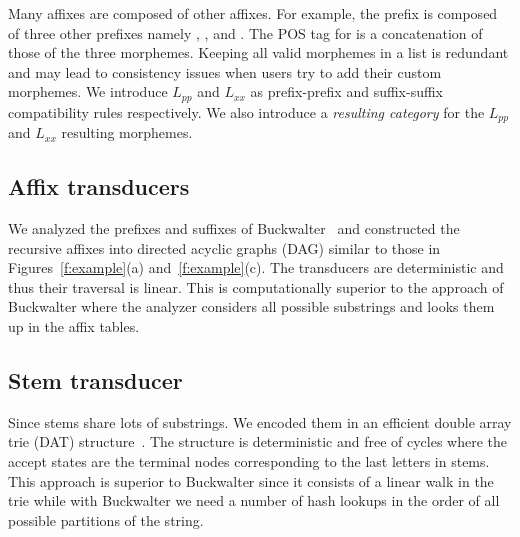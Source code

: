 \documentclass[11pt]{article}
\newcommand{\noTrRL}[1]{\transfalse\RL{#1}\transtrue}
\newcommand{\noTrnoVocRL}[1]{\transfalse\novocalize\noTrRL{#1}\vocalize\transtrue}
\begin{document}
Many affixes are composed of other affixes. For example,
the prefix \noTrnoVocRL{wsy} is composed of three other prefixes
namely \noTrnoVocRL{w}, \noTrnoVocRL{s}, and \noTrnoVocRL{y}.
The POS tag for \noTrnoVocRL{wsy} is a concatenation
of those of the three morphemes. 
Keeping all valid morphemes in a list
is redundant and may lead to consistency issues when
users try to add their custom morphemes.
We introduce $L_{pp}$ and
$L_{xx}$ as prefix-prefix and suffix-suffix 
compatibility rules respectively.
We also introduce a {\em resulting category}
for the $L_{pp}$ and  $L_{xx}$ resulting morphemes.


\subsection{Affix transducers}
\label{sec:affixFSA}

We analyzed the prefixes and suffixes of 
Buckwalter~
and constructed the recursive affixes
into directed acyclic graphs (DAG) similar to 
those in Figures~\ref{f:example}(a) and~\ref{f:example}(c).
The transducers are deterministic and thus 
their traversal is linear.
This is computationally superior to the 
approach of Buckwalter where the analyzer considers
all possible substrings %
and looks them up in the affix tables. 


\subsection{Stem transducer}
\label{sec:stemFSA}


Since stems share lots of substrings. 
We encoded them in
an efficient double array trie (DAT) structure~\cite{Aoe:89}. 
The structure is deterministic and free of cycles where the 
accept states are the terminal nodes corresponding to the last 
letters in stems. 
This approach is superior to Buckwalter since it consists of
a linear walk in the trie while with Buckwalter we need
a number of hash lookups in the order of all possible partitions
of the string.
\end{document}
